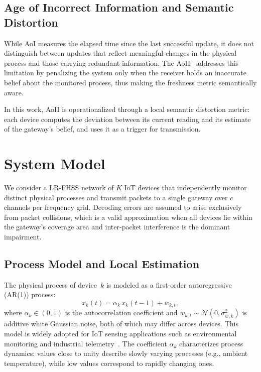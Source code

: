 \documentclass[lettersize,journal]{IEEEtran}
\begin{document}
\subsection{Age of Incorrect Information and Semantic Distortion}
\label{subsec:aoii}

While \ac{AoI} measures the elapsed time since the last successful update, it does not distinguish between updates that reflect meaningful changes in the physical process and those carrying redundant information. The \ac{AoII}~\cite{Munari.2024} addresses this limitation by penalizing the system only when the receiver holds an inaccurate belief about the monitored process, thus making the freshness metric semantically aware.

In this work, \ac{AoII} is operationalized through a local semantic distortion metric: each device computes the deviation between its current reading and its estimate of the gateway's belief, and uses it as a trigger for transmission.

\section{System Model}
\label{sec:model}

We consider a \ac{LR-FHSS} network of $K$ \ac{IoT} devices that independently monitor distinct physical processes and transmit packets to a single gateway over $c$ channels per frequency grid. Decoding errors are assumed to arise exclusively from packet collisions, which is a valid approximation when all devices lie within the gateway's coverage area and inter-packet interference is the dominant impairment.

\subsection{Process Model and Local Estimation}
\label{subsec:process}

The physical process of device~$k$ is modeled as a first-order autoregressive (AR(1)) process:
\begin{equation}
  x_k(t) = \alpha_k\, x_k(t-1) + w_{k,t},
  \label{eq:ar1}
\end{equation}
where $\alpha_k \in (0,1)$ is the autocorrelation coefficient and $w_{k,t} \sim \mathcal{N}(0, \sigma_{w,k}^2)$ is additive white Gaussian noise, both of which may differ across devices. This model is widely adopted for \ac{IoT} sensing applications such as environmental monitoring and industrial telemetry~\cite{Wang.2025}. The coefficient $\alpha_k$ characterizes process dynamics: values close to unity describe slowly varying processes (e.g., ambient temperature), while low values correspond to rapidly changing ones.
\end{document}
